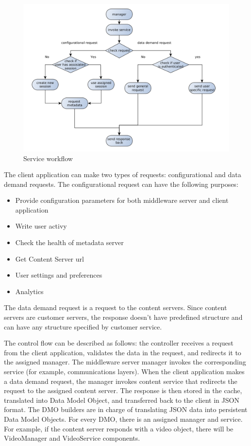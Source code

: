 \begin{figure}[h]
    \centering
	\includegraphics[width=\textwidth]{images/via_service_1.png}
    \caption{Service workflow}
    \label{fig:via_service}
\end{figure}


The client application can make two types of requests: configurational and data demand requests.
The configurational request can have the following purposes:

\begin{itemize}
	\item Provide configuration parameters for both middleware server and client application
	\item Write user activy
	\item Check the health of metadata server
	\item Get Content Server url
	\item User settings and preferences
	\item Analytics
\end{itemize}


The data demand request is a request to the content servers. Since content servers are customer servers, the response doesn't have predefined structure and can have any structure specified by customer service. 

The control flow can be described as follows: the controller receives a request from the client application, validates the data in the request, and redirects it to the assigned manager. The middleware server manager invokes the corresponding service (for example, communications layers). When the client application makes a data demand request, the manager invokes content service that redirects the request to the assigned content server. The response is then stored in the cache, translated into Data Model Object, and transferred back to the client in JSON format. The DMO builders are in charge of translating JSON data into persistent Data Model Objects. For every DMO, there is an assigned manager and service. For example, if the content server responds with a video object, there will be VideoManager and VideoService components.

